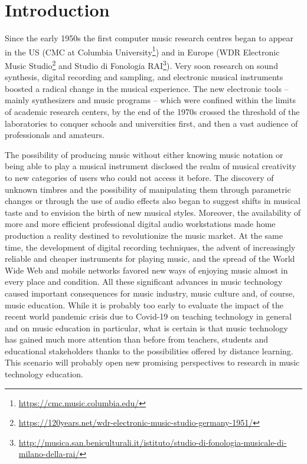 \documentclass[10pt,journal,compsoc]{IEEEtran}
\begin{document}
%
\IEEEpeerreviewmaketitle




\section{Introduction}
\label{sec:intro}

Since the early 1950s the first computer music research centres began to appear in the US (CMC at Columbia University\footnote{\url{https://cmc.music.columbia.edu/}}) and in Europe (WDR Electronic Music Studio\footnote{\url{https://120years.net/wdr-electronic-music-studio-germany-1951/}} and Studio di Fonologia RAI\footnote{\url{http://musica.san.beniculturali.it/istituto/studio-di-fonologia-musicale-di-milano-della-rai/}}). Very soon research on sound synthesis, digital recording and sampling, and electronic musical instruments boosted a radical change in the musical experience. The new electronic tools -- mainly synthesizers and music programs -- which were confined within the limits of academic research centers, by the end of the 1970s crossed the threshold of the laboratories to conquer schools and universities first, and then a vast audience of professionals and amateurs. 

The possibility of producing music without either knowing music notation or being able to play a musical instrument disclosed the realm of musical creativity to new categories of users who could not access it before. The discovery of unknown timbres and the possibility of manipulating them through parametric changes or through the use of audio effects also began to suggest shifts in musical taste and to envision the birth of new musical styles. Moreover, the availability of more and more efficient professional digital audio workstations made home production a reality destined to revolutionize the music market. At the same time, the development of digital recording techniques, the advent of increasingly reliable and cheaper instruments for playing music, and the spread of the World Wide Web and mobile networks favored new ways of enjoying music almost in every place and condition. All these significant advances in music technology caused important consequences for music industry, music culture and, of course, music education. While it is probably too early to evaluate the impact of the recent world pandemic crisis due to Covid-19 on teaching technology in general and on music education in particular, what is certain is that music technology has gained much more attention than before from teachers, students and educational stakeholders thanks to the possibilities offered by distance learning. This scenario will probably open new promising perspectives to research in music technology education. 
\end{document}
